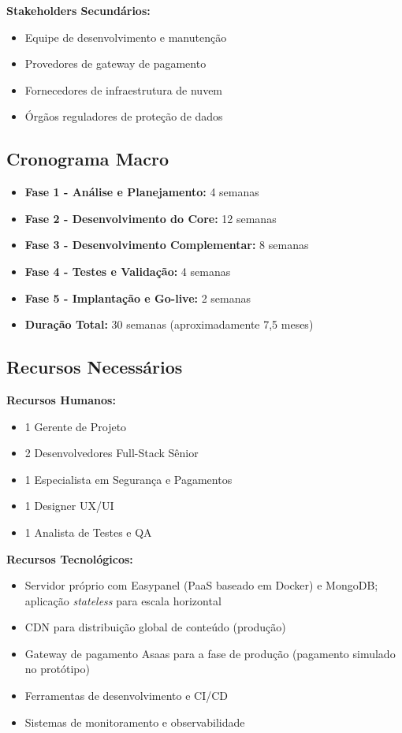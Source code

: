 \textbf{Stakeholders Secundários:}
\begin{itemize}
    \item Equipe de desenvolvimento e manutenção
    \item Provedores de gateway de pagamento
    \item Fornecedores de infraestrutura de nuvem
    \item Órgãos reguladores de proteção de dados
\end{itemize}

\subsection{Cronograma Macro}

\begin{itemize}
    \item \textbf{Fase 1 - Análise e Planejamento:} 4 semanas
    \item \textbf{Fase 2 - Desenvolvimento do Core:} 12 semanas
    \item \textbf{Fase 3 - Desenvolvimento Complementar:} 8 semanas
    \item \textbf{Fase 4 - Testes e Validação:} 4 semanas
    \item \textbf{Fase 5 - Implantação e Go-live:} 2 semanas
    \item \textbf{Duração Total:} 30 semanas (aproximadamente 7,5 meses)
\end{itemize}

\subsection{Recursos Necessários}

\textbf{Recursos Humanos:}
\begin{itemize}
    \item 1 Gerente de Projeto
    \item 2 Desenvolvedores Full-Stack Sênior
    \item 1 Especialista em Segurança e Pagamentos
    \item 1 Designer UX/UI
    \item 1 Analista de Testes e QA
\end{itemize}

\textbf{Recursos Tecnológicos:}
\begin{itemize}
    \item Servidor próprio com Easypanel (PaaS baseado em Docker) e MongoDB; aplicação \textit{stateless} para escala horizontal
    \item CDN para distribuição global de conteúdo (produção)
    \item Gateway de pagamento Asaas para a fase de produção (pagamento simulado no protótipo)
    \item Ferramentas de desenvolvimento e CI/CD
    \item Sistemas de monitoramento e observabilidade
\end{itemize}

